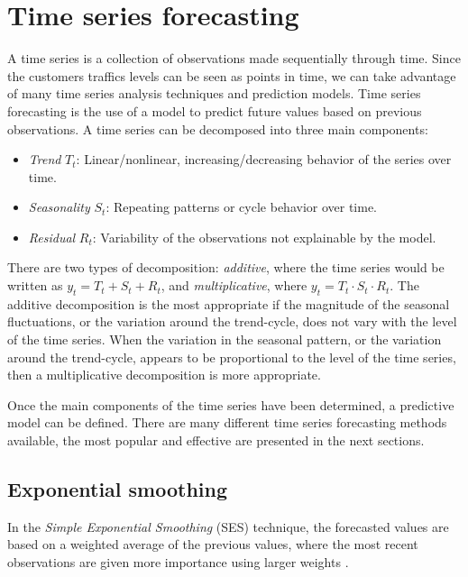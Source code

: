 \section{Time series forecasting}
\label{sec:time_series_forecasting}

A time series is a collection of observations made sequentially through time. Since the customers traffics levels can be seen as points in time, we can take advantage of many time series analysis techniques and prediction models. Time series forecasting is the use of a model to predict future values based on previous observations. A time series can be decomposed into three main components:
\begin{itemize}
  \item \emph{Trend} \( T_t \): Linear/nonlinear, increasing/decreasing behavior of the series over time.
  \item \emph{Seasonality} \( S_t \): Repeating patterns or cycle behavior over time.
  \item \emph{Residual} \( R_t \): Variability of the observations not explainable by the model.
\end{itemize}

There are two types of decomposition: \emph{additive}, where the time series would be written as \( y_t = T_t + S_t + R_t \), and \emph{multiplicative}, where \( y_t = T_t \cdot S_t \cdot R_t \). The additive decomposition is the most appropriate if the magnitude of the seasonal fluctuations, or the variation around the trend-cycle, does not vary with the level of the time series. When the variation in the seasonal pattern, or the variation around the trend-cycle, appears to be proportional to the level of the time series, then a multiplicative decomposition is more appropriate.

Once the main components of the time series have been determined, a predictive model can be defined. There are many different time series forecasting methods available, the most popular and effective are presented in the next sections.

\subsection{Exponential smoothing}
\label{subsec:exponential_smoothing}

In the \emph{Simple Exponential Smoothing} (SES) technique, the forecasted values are based on a weighted average of the previous values, where the most recent observations are given more importance using larger weights \cite{hyndman2018}.

